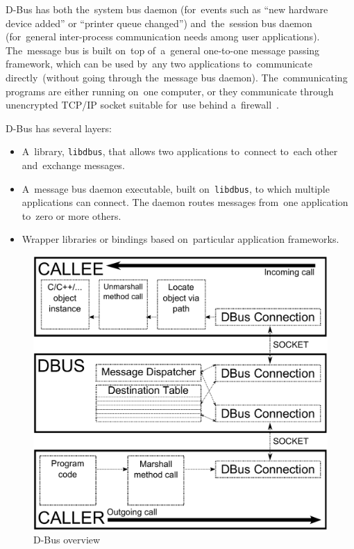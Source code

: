 \documentclass[conference]{IEEEtran}
\begin{document}
D-Bus has both the~system bus daemon (for~events such as ``new hardware device
added'' or ``printer queue changed'') and~the~session bus daemon (for~general
inter-process communication needs among user \mbox{applications}). The~message
bus is built on~top of~a~general one-to-one message passing framework, which
can be used by~any two applications to~communicate directly~(without going
through the~message bus daemon). The~communicating programs are either running
on~one computer, or they communicate through unencrypted TCP/IP socket suitable
for~use behind a~firewall~\cite{dbus}.


D-Bus has several layers:
\begin{itemize}
	\item A~library, \texttt{libdbus}, that allows two applications to~connect
		to~each other and~exchange messages.
	\item A~message bus daemon executable, built on~\texttt{libdbus},
		to which multiple applications can connect. The daemon routes
		messages from~one application to~zero or more others.
	\item Wrapper libraries or bindings based on~particular application frameworks.
\end{itemize}


\begin{figure}[h]
\centering
\includegraphics[width=\columnwidth]{dbus_overview.pdf}
\caption{D-Bus overview}
\label{fig:dbus_image}
\end{figure}
\end{document}
